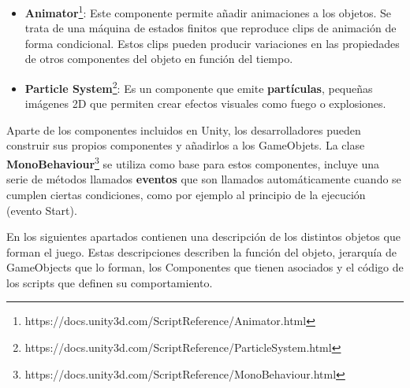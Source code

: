 \begin{itemize}
\item \textbf{Animator}\footnote{https://docs.unity3d.com/ScriptReference/Animator.html}: Este componente permite añadir animaciones a los objetos. Se trata de una máquina de estados finitos que reproduce clips de animación de forma condicional. Estos clips pueden producir variaciones en las propiedades de otros componentes del objeto en función del tiempo.
\item \textbf{Particle System}\footnote{https://docs.unity3d.com/ScriptReference/ParticleSystem.html}: Es un componente que emite \textbf{partículas}, pequeñas imágenes 2D que permiten crear efectos visuales como fuego o explosiones.
\end{itemize}

Aparte de los componentes incluidos en Unity, los desarrolladores pueden construir sus propios componentes y añadirlos a los GameObjets. La clase \textbf{MonoBehaviour}\footnote{https://docs.unity3d.com/ScriptReference/MonoBehaviour.html
} se utiliza como base para estos componentes, incluye una serie de métodos llamados \textbf{eventos} que son llamados automáticamente cuando se cumplen ciertas condiciones, como por ejemplo al principio de la ejecución (evento Start).

En los siguientes apartados contienen una descripción de los distintos objetos que forman el juego. Estas descripciones describen la función del objeto, jerarquía de GameObjects que lo forman, los Componentes que tienen asociados y el código de los scripts que definen su comportamiento.



